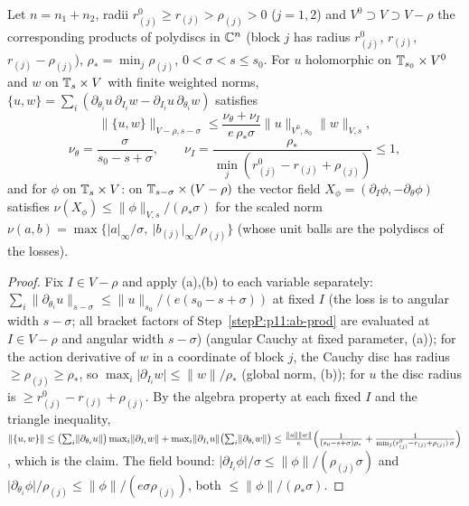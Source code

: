 \begin{lemma}\label{bpP:p11:aniso-bracket}
Let $n=n_1+n_2$, radii $r^0_{(j)}\ge r_{(j)}>\rho_{(j)}>0$ ($j=1,2$) and $V^0\supset V\supset V-\rho$ the corresponding products of polydiscs in $\mathbb{C}^n$ (block $j$ has radius $r^0_{(j)}$, $r_{(j)}$, $r_{(j)}-\rho_{(j)}$), $\rho_*=\min_j\rho_{(j)}$, $0<\sigma<s\le s_0$. For $u$ holomorphic on $\mathbb{T}_{s_0}\times V^0$ and $w$ on $\mathbb{T}_s\times V$ with finite weighted norms, $\{u,w\}=\sum_i(\partial_{\theta_i}u\,\partial_{I_i}w-\partial_{I_i}u\,\partial_{\theta_i}w)$ satisfies
\[\lVert\{u,w\}\rVert_{V-\rho,s-\sigma}\le\frac{\nu_\theta+\nu_I}{e\,\rho_*\sigma}\lVert u\rVert_{V^0,s_0}\lVert w\rVert_{V,s},\]\[\nu_\theta=\frac\sigma{s_0-s+\sigma},\qquad\nu_I=\frac{\rho_*}{\min_j(r^0_{(j)}-r_{(j)}+\rho_{(j)})}\le1,\]
and for $\phi$ on $\mathbb{T}_s\times V$: on $\mathbb{T}_{s-\sigma}\times(V-\rho)$ the vector field $X_\phi=(\partial_I\phi,-\partial_\theta\phi)$ satisfies $\nu(X_\phi)\le\lVert\phi\rVert_{V,s}/(\rho_*\sigma)$ for the scaled norm $\nu(a,b)=\max\{\lvert a\rvert_\infty/\sigma,\ \lvert b_{(j)}\rvert_\infty/\rho_{(j)}\}$ (whose unit balls are the polydiscs of the losses).
\end{lemma}
\begin{proof}
\label{stepP:p11:ab-der} Fix $I\in V-\rho$ and apply (a),(b) to each variable separately: $\sum_i\lVert\partial_{\theta_i}u\rVert_{s-\sigma}\le\lVert u\rVert_{s_0}/(e(s_0-s+\sigma))$ at fixed $I$ (the loss is to angular width $s-\sigma$; all bracket factors of Step~\ref{stepP:p11:ab-prod} are evaluated at $I\in V-\rho$ and angular width $s-\sigma$) (angular Cauchy at fixed parameter, (a)); for the action derivative of $w$ in a coordinate of block $j$, the Cauchy disc has radius $\ge\rho_{(j)}\ge\rho_*$, so $\max_i\lvert\partial_{I_i}w\rvert\le\lVert w\rVert/\rho_*$ (global norm, (b)); for $u$ the disc radius is $\ge r^0_{(j)}-r_{(j)}+\rho_{(j)}$.
\label{stepP:p11:ab-prod} By the algebra property  at each fixed $I$ and the triangle inequality, $\lVert\{u,w\}\rVert\le\bigl(\sum_i\lVert\partial_{\theta_i}u\rVert\bigr)\max_i\lVert\partial_{I_i}w\rVert+\max_i\lVert\partial_{I_i}u\rVert\bigl(\sum_i\lVert\partial_{\theta_i}w\rVert\bigr)\le\frac{\lVert u\rVert\lVert w\rVert}e\Bigl(\frac1{(s_0-s+\sigma)\rho_*}+\frac1{\min_j(r^0_{(j)}-r_{(j)}+\rho_{(j)})\,\sigma}\Bigr)$, which is the claim. The field bound: $\lvert\partial_{I_i}\phi\rvert/\sigma\le\lVert\phi\rVert/(\rho_{(j)}\sigma)$ and $\lvert\partial_{\theta_i}\phi\rvert/\rho_{(j)}\le\lVert\phi\rVert/(e\sigma\rho_{(j)})$, both $\le\lVert\phi\rVert/(\rho_*\sigma)$.
\end{proof}

